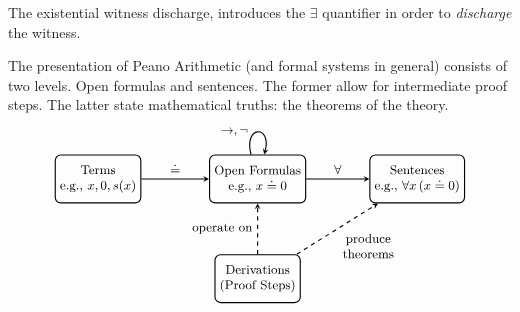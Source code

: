 \begin{rem}
    The existential witness discharge, introduces the $\exists$ quantifier in order to \textit{discharge} the witness.
\end{rem}


\begin{rem}
    The presentation of Peano Arithmetic (and formal systems in general) consists of two levels. Open formulas and sentences. The former allow for intermediate proof steps. The latter state mathematical truths: the theorems of the theory.
    \[
    \begin{tikzpicture}[node distance=2cm, auto, thick, >=stealth,font=\small]
        \node (Terms) [draw, rectangle, rounded corners, align=center, minimum height=1.2cm] {Terms \\ \small e.g., $x, 0, s(x)$};
        
        \node (Open) [draw, rectangle, rounded corners, align=center, right of=Terms, node distance=4.0cm, minimum height=1.2cm] {Open Formulas \\ \small e.g., $x\doteq0$};
        
        \node (Sentences) [draw, rectangle, rounded corners, align=center, right of=Open, node distance=4cm, minimum height=1.2cm] {Sentences \\ \small e.g., $\forall x\,(x\doteq0)$};
        
        \node (Derivations) [draw, rectangle, rounded corners, align=center, below of=Open, node distance=2.5cm, minimum height=1.2cm] {Derivations \\ \small(Proof Steps)};
    
        \draw[->] (Terms) -- node[above] {$\doteq$} (Open);
        \draw[->] (Open) edge[loop above, looseness=6, min distance=2mm] node[left] {$\to, \neg\ $} (Open);
        \draw[->] (Open) -- node[above] {$\forall$} (Sentences);
        \draw[->, dashed] (Derivations) -- node[left] {\small operate on} (Open);
        \draw[->, dashed] (Derivations) -- node[below right, align=center] {\small produce \\ \small theorems} (Sentences);
    \end{tikzpicture}
    \]
\end{rem}

